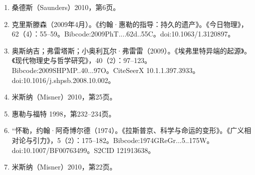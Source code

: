 \begin{enumerate}
\item 桑德斯（Saunders）2010，第6页。
\item 克里斯滕森（2009年4月）。《约翰·惠勒的指导：持久的遗产》。《今日物理》，62（4）：55–59。Bibcode:2009PhT....62d..55C。doi:10.1063/1.3120897。
\item 奥斯纳吉；弗雷塔斯；小奥利瓦尔·弗雷雷（2009）。《埃弗里特异端的起源》。《现代物理史与哲学研究》，40（2）：97–123。Bibcode:2009SHPMP..40...97O。CiteSeerX 10.1.1.397.3933。doi:10.1016/j.shpsb.2008.10.002。
\item 米斯纳（Misner）2010，第25页。
\item 惠勒与福特 1998，第232–234页。
\item “怀勒，约翰·阿奇博尔德（1974）。《拉斯普京、科学与命运的变形》。《广义相对论与引力》，5（2）：175–182。Bibcode:1974GReGr...5..175W。doi:10.1007/BF00763499。S2CID 121913638。
\item 米斯纳（Misner）2010，第22页。

\end{enumerate}